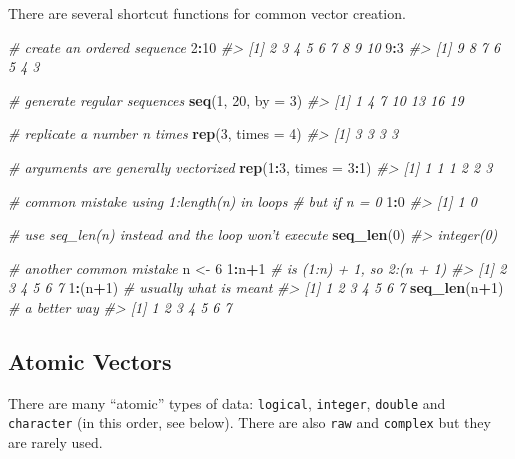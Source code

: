 \documentclass[]{book}
\newenvironment{Shaded}{\begin{snugshade}}{\end{snugshade}}
\newcommand{\KeywordTok}[1]{\textcolor[rgb]{0.13,0.29,0.53}{\textbf{#1}}}
\newcommand{\DataTypeTok}[1]{\textcolor[rgb]{0.13,0.29,0.53}{#1}}
\newcommand{\DecValTok}[1]{\textcolor[rgb]{0.00,0.00,0.81}{#1}}
\newcommand{\StringTok}[1]{\textcolor[rgb]{0.31,0.60,0.02}{#1}}
\newcommand{\CommentTok}[1]{\textcolor[rgb]{0.56,0.35,0.01}{\textit{#1}}}
\newcommand{\OperatorTok}[1]{\textcolor[rgb]{0.81,0.36,0.00}{\textbf{#1}}}
\newcommand{\NormalTok}[1]{#1}
\theoremstyle{definition}
\theoremstyle{definition}
\theoremstyle{definition}
\theoremstyle{remark}
\begin{document}
There are several shortcut functions for common vector creation.

\begin{Shaded}
\begin{Highlighting}[]
\CommentTok{# create an ordered sequence}
\DecValTok{2}\OperatorTok{:}\DecValTok{10}
\CommentTok{#> [1]  2  3  4  5  6  7  8  9 10}
\DecValTok{9}\OperatorTok{:}\DecValTok{3}
\CommentTok{#> [1] 9 8 7 6 5 4 3}

\CommentTok{# generate regular sequences}
\KeywordTok{seq}\NormalTok{(}\DecValTok{1}\NormalTok{, }\DecValTok{20}\NormalTok{, }\DataTypeTok{by =} \DecValTok{3}\NormalTok{)}
\CommentTok{#> [1]  1  4  7 10 13 16 19}

\CommentTok{# replicate a number n times}
\KeywordTok{rep}\NormalTok{(}\DecValTok{3}\NormalTok{, }\DataTypeTok{times =} \DecValTok{4}\NormalTok{)}
\CommentTok{#> [1] 3 3 3 3}

\CommentTok{# arguments are generally vectorized}
\KeywordTok{rep}\NormalTok{(}\DecValTok{1}\OperatorTok{:}\DecValTok{3}\NormalTok{, }\DataTypeTok{times =} \DecValTok{3}\OperatorTok{:}\DecValTok{1}\NormalTok{)}
\CommentTok{#> [1] 1 1 1 2 2 3}

\CommentTok{# common mistake using 1:length(n) in loops}
\CommentTok{# but if n = 0}
\DecValTok{1}\OperatorTok{:}\DecValTok{0}
\CommentTok{#> [1] 1 0}

\CommentTok{# use seq_len(n) instead and the loop won't execute}
\KeywordTok{seq_len}\NormalTok{(}\DecValTok{0}\NormalTok{)}
\CommentTok{#> integer(0)}

\CommentTok{# another common mistake}
\NormalTok{n <-}\StringTok{ }\DecValTok{6}
\DecValTok{1}\OperatorTok{:}\NormalTok{n}\OperatorTok{+}\DecValTok{1}        \CommentTok{# is (1:n) + 1, so 2:(n + 1)}
\CommentTok{#> [1] 2 3 4 5 6 7}
\DecValTok{1}\OperatorTok{:}\NormalTok{(n}\OperatorTok{+}\DecValTok{1}\NormalTok{)      }\CommentTok{# usually what is meant}
\CommentTok{#> [1] 1 2 3 4 5 6 7}
\KeywordTok{seq_len}\NormalTok{(n}\OperatorTok{+}\DecValTok{1}\NormalTok{) }\CommentTok{# a better way}
\CommentTok{#> [1] 1 2 3 4 5 6 7}
\end{Highlighting}
\end{Shaded}

\subsection{Atomic Vectors}\label{atomic-vectors}

There are many ``atomic'' types of data: \texttt{logical},
\texttt{integer}, \texttt{double} and \texttt{character} (in this order,
see below). There are also \texttt{raw} and \texttt{complex} but they
are rarely used.
\end{document}
